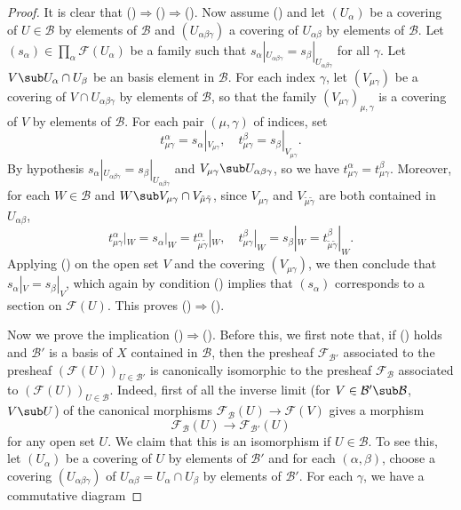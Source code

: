 \begin{proof}
It is clear that ()$\Rightarrow$()$\Rightarrow$(). Now assume () and let $(U_\alpha)$ be a covering of $U\in\mathcal{B}$ by elements of $\mathcal{B}$ and $(U_{\alpha\beta\gamma})$ a covering of $U_{\alpha\beta}$ by elements of $\mathcal{B}$. Let $(s_\alpha)\in\prod_\alpha\mathscr{F}(U_\alpha)$ be a family such that $s_\alpha|_{U_{\alpha\beta\gamma}}=s_\beta|_{U_{\alpha\beta\gamma}}$ for all $\gamma$. Let $V\sub U_\alpha\cap U_\beta$ be an basis element in $\mathcal{B}$. For each index $\gamma$, let $(V_{\mu\gamma})$ be a covering of $V\cap U_{\alpha\beta\gamma}$ by elements of $\mathcal{B}$, so that the family $(V_{\mu\gamma})_{\mu,\gamma}$ is a covering of $V$ by elements of $\mathcal{B}$. For each pair $(\mu,\gamma)$ of indices, set
\[t^\alpha_{\mu\gamma}=s_\alpha|_{V_{\mu\gamma}},\quad t^{\beta}_{\mu\gamma}=s_\beta|_{V_{\mu\gamma}}.\]
By hypothesis $s_\alpha|_{U_{\alpha\beta\gamma}}=s_\beta|_{U_{\alpha\beta\gamma}}$ and $V_{\mu\gamma}\sub U_{\alpha\beta\gamma}$, so we have $t^{\alpha}_{\mu\gamma}=t^{\beta}_{\mu\gamma}$. Moreover, for each $W\in\mathcal{B}$ and $W\sub V_{\mu\gamma}\cap V_{\tilde{\mu}\tilde{\gamma}}$, since $V_{\mu\gamma}$ and $V_{\tilde{\mu}\tilde{\gamma}}$ are both contained in $U_{\alpha\beta}$,
\[t^\alpha_{\mu\gamma}|_W=s_\alpha|_W=t^\alpha_{\tilde{\mu}\tilde{\gamma}}|_W,\quad t^\beta_{\mu\gamma}|_W=s_\beta|_W=t^\beta_{\tilde{\mu}\tilde{\gamma}}|_W.\]
Applying () on the open set $V$ and the covering $(V_{\mu\gamma})$, we then conclude that $s_\alpha|_V=s_\beta|_V$, which again by condition () implies that $(s_\alpha)$ corresponds to a section on $\mathscr{F}(U)$. This proves ()$\Rightarrow$().\par
Now we prove the implication ()$\Rightarrow$(). Before this, we first note that, if () holds and $\mathcal{B}'$ is a basis of $X$ contained in $\mathcal{B}$, then the presheaf $\mathscr{F}_{\mathcal{B}'}$ associated to the presheaf $(\mathscr{F}(U))_{U\in\mathcal{B}'}$ is canonically isomorphic to the presheaf $\mathscr{F}_{\mathcal{B}}$ associated to $(\mathscr{F}(U))_{U\in\mathcal{B}}$. Indeed, first of all the inverse limit (for $V\in\mathcal{B}'\sub\mathcal{B}$, $V\sub U$) of the canonical morphisms $\mathscr{F}_{\mathcal{B}}(U)\to\mathscr{F}(V)$ gives a morphism
\[\mathscr{F}_{\mathcal{B}}(U)\to\mathscr{F}_{\mathcal{B}'}(U)\]
for any open set $U$. We claim that this is an isomorphism if $U\in\mathcal{B}$. To see this, let $(U_\alpha)$ be a covering of $U$ by elements of $\mathcal{B}'$ and for each $(\alpha,\beta)$, choose a covering $(U_{\alpha\beta\gamma})$ of $U_{\alpha\beta}=U_\alpha\cap U_\beta$ by elements of $\mathcal{B}'$. For each $\gamma$, we have a commutative diagram

\end{proof}
